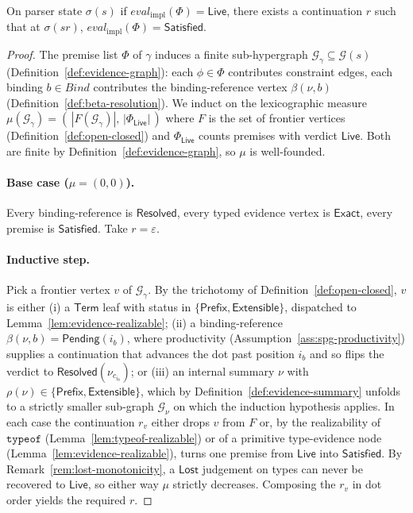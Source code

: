 \begin{lemma}
	\label{lem:rule-realizable}
	On parser state $\sigma(s)$ if $\mathit{eval}_\text{impl}(\Phi) = \mathsf{Live}$, there exists a continuation $r$ such that at $\sigma(sr)$, $\mathit{eval}_\text{impl}(\Phi) = \mathsf{Satisfied}.$
\end{lemma}
\begin{proof}
	The premise list $\Phi$ of $\gamma$ induces a finite sub-hypergraph $\mathcal G_\gamma \subseteq \mathcal G(s)$ (Definition~\ref{def:evidence-graph}): each $\phi \in \Phi$ contributes constraint edges, each binding $b \in \mathit{Bind}$ contributes the binding-reference vertex $\beta(\nu,b)$ (Definition~\ref{def:beta-resolution}). We induct on the lexicographic measure $\mu(\mathcal G_\gamma) = (\,|F(\mathcal G_\gamma)|,\,|\Phi_{\mathsf{Live}}|\,)$ where $F$ is the set of frontier vertices (Definition~\ref{def:open-closed}) and $\Phi_{\mathsf{Live}}$ counts premises with verdict $\mathsf{Live}$. Both are finite by Definition~\ref{def:evidence-graph}, so $\mu$ is well-founded.

	\paragraph{Base case ($\mu = (0,0)$).} Every binding-reference is $\mathsf{Resolved}$, every typed evidence vertex is $\mathsf{Exact}$, every premise is $\mathsf{Satisfied}$. Take $r = \varepsilon$.

	\paragraph{Inductive step.} Pick a frontier vertex $v$ of $\mathcal G_\gamma$. By the trichotomy of Definition~\ref{def:open-closed}, $v$ is either (i) a $\mathsf{Term}$ leaf with status in $\{\mathsf{Prefix},\mathsf{Extensible}\}$, dispatched to Lemma~\ref{lem:evidence-realizable}; (ii) a binding-reference $\beta(\nu,b) = \mathsf{Pending}(i_b)$, where productivity (Assumption~\ref{ass:spg-productivity}) supplies a continuation that advances the dot past position $i_b$ and so flips the verdict to $\mathsf{Resolved}(\nu_{c_{i_b}})$; or (iii) an internal summary $\nu$ with $\rho(\nu)\in\{\mathsf{Prefix},\mathsf{Extensible}\}$, which by Definition~\ref{def:evidence-summary} unfolds to a strictly smaller sub-graph $\mathcal G_{\nu}$ on which the induction hypothesis applies. In each case the continuation $r_v$ either drops $v$ from $F$ or, by the realizability of $\mathtt{typeof}$ (Lemma~\ref{lem:typeof-realizable}) or of a primitive type-evidence node (Lemma~\ref{lem:evidence-realizable}), turns one premise from $\mathsf{Live}$ into $\mathsf{Satisfied}$. By Remark~\ref{rem:lost-monotonicity}, a $\mathsf{Lost}$ judgement on types can never be recovered to $\mathsf{Live}$, so either way $\mu$ strictly decreases. Composing the $r_v$ in dot order yields the required $r$.
\end{proof}

